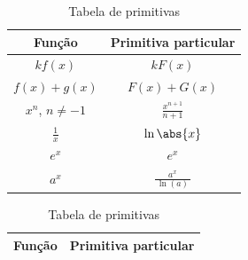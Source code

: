 \begin{table}[b]
  \centering
  \caption{Tabela de primitivas}
  \label{tab:primitivas}
  \renewcommand*{\arraystretch}{2}
  \begin{tabular}{c<{\quad}>{\quad}c}
    \hline
    Função                      & Primitiva particular    \\ \hline
    \(kf(x)\)                   & \(kF(x)\)               \\
    \(f(x)+g(x)\)               & \(F(x)+G(x)\)           \\[1mm]
    \(x^n\), \(n \neq -1\)      & \(\frac{x^{n+1}}{n+1}\) \\[1mm]
    \(\frac{1}{x}\)             & \(\ln\abs{x}\)          \\
    \(e^x\)                     & \(e^x\)                 \\
    \(a^x\)                     & \(\frac{a^x}{\,\ln(a)\,}\) \\[15mm]
    \hline
  \end{tabular}\;
  \begin{tabular}{c<{\quad}>{\quad}c}
    \hline
    Função                      & Primitiva particular    \\ \hline

\end{tabular}
\end{table}
